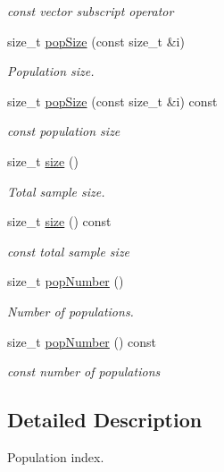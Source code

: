 \begin{DoxyCompactItemize}
\begin{DoxyCompactList}\small\item\em {\ttfamily const} vector subscript operator \end{DoxyCompactList}\item 
size\+\_\+t \hyperlink{classvarfiles_1_1_pop_index_a784669c55259efb8c5b7cdffe4f3c39b}{pop\+Size} (const size\+\_\+t \&i)
\begin{DoxyCompactList}\small\item\em Population size. \end{DoxyCompactList}\item 
size\+\_\+t \hyperlink{classvarfiles_1_1_pop_index_a6161e78ceb0c2914ccfe49350b675544}{pop\+Size} (const size\+\_\+t \&i) const
\begin{DoxyCompactList}\small\item\em {\ttfamily const} population size \end{DoxyCompactList}\item 
size\+\_\+t \hyperlink{classvarfiles_1_1_pop_index_a7b56e92bf067e13f2369fef479e885e5}{size} ()
\begin{DoxyCompactList}\small\item\em Total sample size. \end{DoxyCompactList}\item 
size\+\_\+t \hyperlink{classvarfiles_1_1_pop_index_a0ec0d2bb7d598c684896f59a6a06d34c}{size} () const
\begin{DoxyCompactList}\small\item\em {\ttfamily const} total sample size \end{DoxyCompactList}\item 
size\+\_\+t \hyperlink{classvarfiles_1_1_pop_index_a794757014bd6e995f83de9f047183403}{pop\+Number} ()
\begin{DoxyCompactList}\small\item\em Number of populations. \end{DoxyCompactList}\item 
size\+\_\+t \hyperlink{classvarfiles_1_1_pop_index_a1bb398f99ba1916ea1b47f599c946e8d}{pop\+Number} () const
\begin{DoxyCompactList}\small\item\em {\ttfamily const} number of populations \end{DoxyCompactList}\end{DoxyCompactItemize}


\subsection{Detailed Description}
Population index. 

